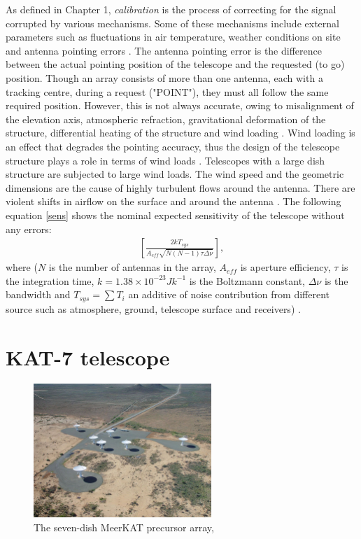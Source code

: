 As defined in Chapter 1, \textit{calibration} is the process of correcting for the signal corrupted by various mechanisms. Some of these mechanisms include external parameters such as fluctuations in air temperature, weather conditions on site and antenna pointing errors \citep{taylor1999synthesis}. The antenna pointing error is the difference between the actual pointing position  of the telescope and the requested (to go) position. Though an array consists of more than one antenna, each with a tracking centre, during a request ("POINT"), they must all follow the same required position. However, this is not always accurate, owing to misalignment of the elevation axis, atmospheric refraction, gravitational deformation of the structure, differential heating of the structure and wind loading \citep{taylor1999synthesis}. Wind loading is an effect that degrades the pointing accuracy, thus the design of the telescope structure plays a role in terms of wind loads \citep{smithdynamic}. Telescopes with a large dish structure are subjected to large wind loads. The wind speed and the geometric dimensions are the cause of highly turbulent flows around the antenna. There are violent shifts in airflow on the surface and around the antenna \citep{upnere2012characterization}. The following equation \ref{sens} shows the nominal expected sensitivity of the telescope without any errors:
\begin{align}
\left[\frac{2kT_{sys}}{A_{eff}\sqrt{N(N-1)\tau \Delta \nu}}\right]
\label{sens},
\end{align}
 where ($N$ is the number of antennas in the array,  $A_{eff}$ is aperture efficiency, $\tau$ is the integration time, $k=1.38\times 10^{-23}Jk^{-1}$ is the Boltzmann constant, $\Delta \nu$ is the bandwidth and $T_{sys}=\sum T_{i}$ an additive of noise contribution from different source such as atmosphere, ground, telescope surface and receivers) \citep{wilson2013tools}. 



\section{KAT-7 telescope}
\label{kat7}

\begin{figure}[H]
  \centering
    \includegraphics[width=0.6\textwidth]{images/K7.png}
    \caption{The seven-dish MeerKAT precursor array, \citep{carignan2013kat}}
  \label{images/kat7.png}
\end{figure}

